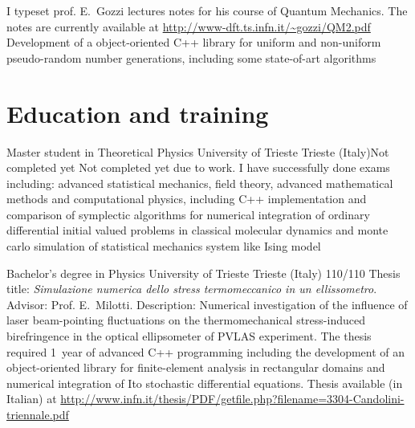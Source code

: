 \documentclass[10pt,a4paper]{moderncv}   %
\begin{document}
{   I typeset prof. E.~Gozzi lectures notes for his course of Quantum Mechanics.
   The notes are currently available at 
   \url{http://www-dft.ts.infn.it/~gozzi/QM2.pdf}}
{}{Development of a object-oriented C++ library for uniform and non-uniform
   pseudo-random number generations, including some state-of-art algorithms}

\section{Education and training}
%
{Master student in Theoretical Physics}
{University of Trieste}
{Trieste (Italy)}{Not completed yet}
{Not completed yet due to work. I have successfully done  exams including: advanced statistical mechanics,
   field theory, advanced mathematical methods and computational physics,
   including C++
   implementation and comparison of symplectic algorithms for numerical
   integration of ordinary differential initial valued problems in classical
   molecular dynamics and monte carlo simulation of statistical mechanics
   system like Ising model}

{Bachelor's degree in Physics}
{University of Trieste}
{Trieste (Italy)}
{110/110}
{Thesis title: \emph{Simulazione numerica dello stress termomeccanico in un
      ellissometro}.
   Advisor: Prof. E.~Milotti.
   Description:
Numerical investigation of the influence of laser beam-pointing fluctuations 
on the
   thermomechanical stress-induced birefringence in the optical
   ellipsometer of PVLAS experiment. The thesis required 1~year of advanced C++ programming
   including the development of an object-oriented library for finite-element
   analysis in rectangular domains and numerical integration of Ito stochastic differential
   equations.
Thesis available (in Italian) at 
\url{http://www.infn.it/thesis/PDF/getfile.php?filename=3304-Candolini-triennale.pdf}
}
    
\end{document}

